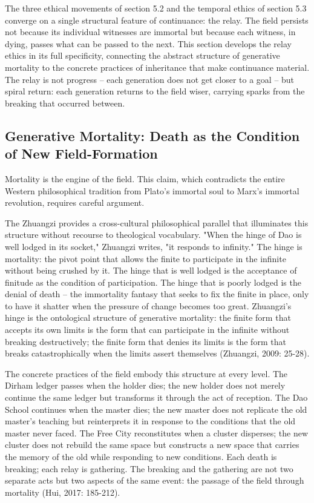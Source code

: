 The three ethical movements of section 5.2 and the temporal ethics of section 5.3 converge on a single structural feature of continuance: the relay. The field persists not because its individual witnesses are immortal but because each witness, in dying, passes what can be passed to the next. This section develops the relay ethics in its full specificity, connecting the abstract structure of generative mortality to the concrete practices of inheritance that make continuance material. The relay is not progress -- each generation does not get closer to a goal -- but spiral return: each generation returns to the field wiser, carrying sparks from the breaking that occurred between.

\subsection{Generative Mortality: Death as the Condition of New Field-Formation}

Mortality is the engine of the field. This claim, which contradicts the entire Western philosophical tradition from Plato's immortal soul to Marx's immortal revolution, requires careful argument.

The Zhuangzi provides a cross-cultural philosophical parallel that illuminates this structure without recourse to theological vocabulary. "When the hinge of Dao is well lodged in its socket," Zhuangzi writes, "it responds to infinity." The hinge is mortality: the pivot point that allows the finite to participate in the infinite without being crushed by it. The hinge that is well lodged is the acceptance of finitude as the condition of participation. The hinge that is poorly lodged is the denial of death -- the immortality fantasy that seeks to fix the finite in place, only to have it shatter when the pressure of change becomes too great. Zhuangzi's hinge is the ontological structure of generative mortality: the finite form that accepts its own limits is the form that can participate in the infinite without breaking destructively; the finite form that denies its limits is the form that breaks catastrophically when the limits assert themselves (Zhuangzi, 2009: 25-28).

The concrete practices of the field embody this structure at every level. The Dirham ledger passes when the holder dies; the new holder does not merely continue the same ledger but transforms it through the act of reception. The Dao School continues when the master dies; the new master does not replicate the old master's teaching but reinterprets it in response to the conditions that the old master never faced. The Free City reconstitutes when a cluster disperses; the new cluster does not rebuild the same space but constructs a new space that carries the memory of the old while responding to new conditions. Each death is breaking; each relay is gathering. The breaking and the gathering are not two separate acts but two aspects of the same event: the passage of the field through mortality (Hui, 2017: 185-212).

